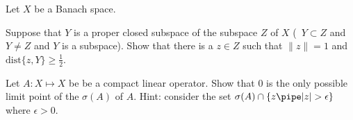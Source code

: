 Let $X$ be a Banach space.
\begin{alist}
\item Suppose that $Y$ is a proper closed subspace of the subspace $Z$
of $X$ (\ie\ $Y\subset Z$ and $Y\neq Z$ and $Y$ is a subspace). Show
that there is a $z\in Z$ such that $\|z\|=1$ and
$\text{dist}\{z,Y\}\geq \frac{1}{2}$.
\item Let $A:X\mapsto X$ be be a compact linear operator. Show that
$0$ is the only possible limit point of the $\sigma(A)$ of $A$. Hint:
consider the set $\sigma(A)\cap \{z \pipe |z|>\epsilon\}$ where
$\epsilon>0$.
\end{alist}
